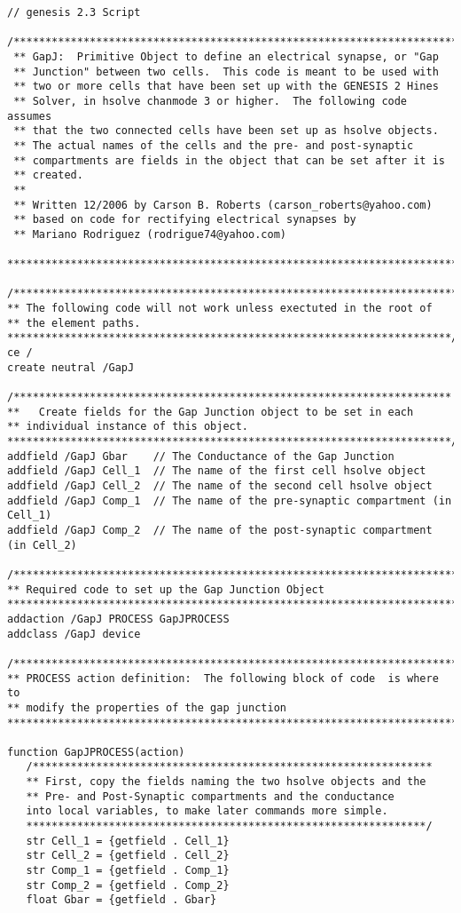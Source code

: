 \documentclass[12pt]{article}
\begin{document}
\begin{small}
\begin{verbatim}
// genesis 2.3 Script

/***********************************************************************
 ** GapJ:  Primitive Object to define an electrical synapse, or "Gap
 ** Junction" between two cells.  This code is meant to be used with
 ** two or more cells that have been set up with the GENESIS 2 Hines
 ** Solver, in hsolve chanmode 3 or higher.  The following code assumes
 ** that the two connected cells have been set up as hsolve objects.
 ** The actual names of the cells and the pre- and post-synaptic
 ** compartments are fields in the object that can be set after it is
 ** created.
 **
 ** Written 12/2006 by Carson B. Roberts (carson_roberts@yahoo.com)
 ** based on code for rectifying electrical synapses by
 ** Mariano Rodriguez (rodrigue74@yahoo.com)
 ************************************************************************/

/**********************************************************************
** The following code will not work unless exectuted in the root of
** the element paths.
**********************************************************************/
ce /
create neutral /GapJ

/*********************************************************************
**   Create fields for the Gap Junction object to be set in each
** individual instance of this object.
**********************************************************************/
addfield /GapJ Gbar    // The Conductance of the Gap Junction
addfield /GapJ Cell_1  // The name of the first cell hsolve object
addfield /GapJ Cell_2  // The name of the second cell hsolve object
addfield /GapJ Comp_1  // The name of the pre-synaptic compartment (in Cell_1)
addfield /GapJ Comp_2  // The name of the post-synaptic compartment (in Cell_2)

/*************************************************************************
** Required code to set up the Gap Junction Object
*************************************************************************/
addaction /GapJ PROCESS GapJPROCESS
addclass /GapJ device

/*************************************************************************
** PROCESS action definition:  The following block of code  is where to
** modify the properties of the gap junction
**************************************************************************/

function GapJPROCESS(action)
   /***************************************************************
   ** First, copy the fields naming the two hsolve objects and the
   ** Pre- and Post-Synaptic compartments and the conductance
   into local variables, to make later commands more simple.
   ***************************************************************/
   str Cell_1 = {getfield . Cell_1}
   str Cell_2 = {getfield . Cell_2}
   str Comp_1 = {getfield . Comp_1}
   str Comp_2 = {getfield . Comp_2}
   float Gbar = {getfield . Gbar}


\end{verbatim}
\end{small}
\end{document}
